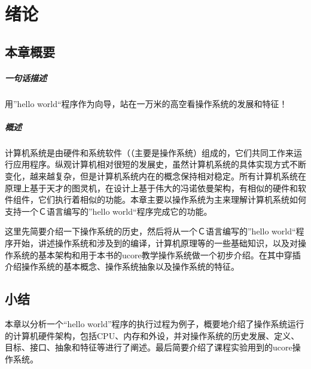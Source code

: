 
\chapter{绪论}\label{ch_intro}

\section{本章概要}

\paragraph{一句话描述}

用”hello world“程序作为向导，站在一万米的高空看操作系统的发展和特征！

\paragraph{概述}

计算机系统是由硬件和系统软件（（主要是操作系统）组成的，它们共同工作来运行应用程序。纵观计算机相对很短的发展史，虽然计算机系统的具体实现方式不断变化，越来越复杂，但是计算机系统内在的概念保持相对稳定。所有计算机系统在原理上基于天才的图灵机，在设计上基于伟大的冯诺依曼架构，有相似的硬件和软件组件，它们执行着相似的功能。本章主要以操作系统为主来理解计算机系统如何支持一个Ｃ语言编写的”hello world“程序完成它的功能。

这里先简要介绍一下操作系统的历史，然后将从一个Ｃ语言编写的”hello world“程序开始，讲述操作系统和涉及到的编译，计算机原理等的一些基础知识，以及对操作系统的基本架构和用于本书的ucore教学操作系统做一个初步介绍。在其中穿插介绍操作系统的基本概念、操作系统抽象以及操作系统的特征。

%

%




\section{小结}
本章以分析一个“hello world”程序的执行过程为例子，概要地介绍了操作系统运行的计算机硬件架构，包括CPU、内存和外设，并对操作系统的历史发展、定义、目标、接口、抽象和特征等进行了阐述。最后简要介绍了课程实验用到的ucore操作系统。